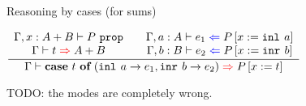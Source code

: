 \documentclass{beamer}
\begin{document}
\begin{frame}{Reasoning by cases (for sums)}

\begin{center}
  $\infrule{\begin{array}{c} \prop[\extend{\Gamma}{x}{\Sum{A}{B}}]{P} \\ \infer{t}{\Sum{A}{B}} \end{array} \quad \begin{array}{c} \proofcheck[\extend{\Gamma}{a}{A}]{e_1}{\subst{P}{x}{\inl{a}}} \\ \proofcheck[\extend{\Gamma}{b}{B}]{e_2}{\subst{P}{x}{\inr{b}}} \end{array}}{\proofinfer{\sumind{t}{a}{e_1}{b}{e_2}}{\subst{P}{x}{t}}}$
\end{center}

\vspace{2em}

TODO: the modes are completely wrong.

\end{frame}
\end{document}
